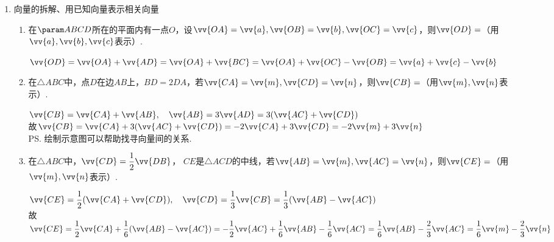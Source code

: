 \begin{enumerate}
\begin{enumerate}
\begin{jieda}
            所以 $\bigtriangleup  {ABC}$ 为直角三角形.
        \end{jieda}
    \end{enumerate}
    \item 向量的拆解、用已知向量表示相关向量
    \begin{enumerate}
        \item 在$\param ABCD$所在的平面内有一点$O$，设$\vv{OA} = \vv{a}, \vv{OB} = \vv{b}, \vv{OC} = \vv{c}$，则$\vv{OD} = $（用$\vv{a}, \vv{b}, \vv{c}$表示）.
        \begin{jieda}
            $\vv{OD} = \vv{OA} + \vv{AD} = \vv{OA} + \vv{BC}  = \vv{OA} + \vv{OC} - \vv{OB} = \vv{a} + \vv{c} - \vv{b}$
        \end{jieda}
        \item 在$\triangle ABC$中，点$D$在边$AB$上，$BD = 2DA$，若$\vv{CA} = \vv{m}, \vv{CD} = \vv{n}$，则$\vv{CB} = $（用$\vv{m}, \vv{n}$表示）.
        \begin{jieda}
            $\vv{CB} = \vv{CA} + \vv{AB}, \quad \vv{AB} = 3\vv{AD} = 3(\vv{AC} + \vv{CD})$ \\
            故$\vv{CB} = \vv{CA} + 3(\vv{AC} + \vv{CD}) = -2\vv{CA} + 3 \vv{CD} = -2\vv{m} + 3 \vv{n}$ \\
            \ps 绘制示意图可以帮助找寻向量间的关系.
        \end{jieda}
        \item 在$\triangle ABC$中，$\vv{CD} = \dfrac{1}{2} \vv{DB}$， $CE$是$\triangle ACD$的中线，若$\vv{AB} = \vv{m}, \vv{AC} = \vv{n}$，则$\vv{CE} = $（用$\vv{m}, \vv{n}$表示）.
        \begin{jieda}
            $\vv{CE} = \dfrac{1}{2}(\vv{CA} + \vv{CD}), \quad \vv{CD} = \dfrac{1}{3} \vv{CB} = \dfrac{1}{3}(\vv{AB} - \vv{AC})$ \\
            故$\vv{CE} = \dfrac{1}{2}\vv{CA} + \dfrac{1}{6}(\vv{AB} - \vv{AC}) = -\dfrac{1}{2}\vv{AC} + \dfrac{1}{6} \vv{AB} - \dfrac{1}{6} \vv{AC} = \dfrac{1}{6} \vv{AB} - \dfrac{2}{3} \vv{AC} = \dfrac{1}{6}\vv{m} - \dfrac{2}{3} \vv{n}$
        \end{jieda}
    \end{enumerate}



\end{enumerate}
